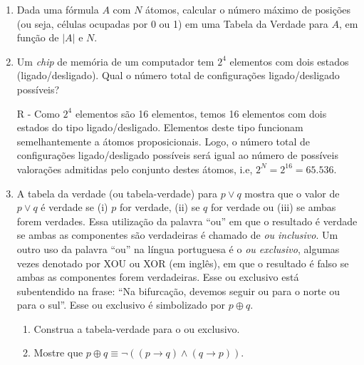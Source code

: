 \documentclass[12pt,a4paper,oneside]{article}
\begin{document}
\begin{enumerate}
	\item Dada uma fórmula $A$ com $N$ átomos, calcular o número máximo de posições (ou seja, células ocupadas por 0 ou 1) em uma Tabela da Verdade para $A$, em função de $|A|$ e $N$.
	
	
	\item Um {\it chip} de memória de um computador tem $2^4$ elementos com dois estados (ligado/desligado). Qual o número total de configurações ligado/desligado possíveis?
	
	{\color{verde} R - Como $2^4$ elementos são 16 elementos, temos 16 elementos com dois estados do tipo ligado/desligado. Elementos deste tipo funcionam semelhantemente a átomos proposicionais. Logo, o número total de configurações ligado/desligado possíveis será igual ao número de possíveis valorações admitidas pelo conjunto destes átomos, i.e, $2^N =2^{16} =  65.536$.	
	}
	
	\item A tabela da verdade (ou tabela-verdade) para $p \vee q$ mostra que o valor de $p \vee q$ é verdade se (i) $p$ for verdade, (ii) se $q$ for verdade ou (iii) se ambas forem verdades. Essa utilização da palavra ``ou'' em que o resultado é verdade se ambas as componentes são verdadeiras é chamado de {\it ou inclusivo}. Um outro uso da palavra ``ou'' na língua portuguesa é o {\it ou exclusivo}, algumas vezes denotado por XOU ou XOR (em inglês), em que o resultado é falso se ambas as componentes forem verdadeiras. Esse ou exclusivo está subentendido na frase: ``Na bifurcação, devemos seguir ou para o norte ou para o sul''. Esse ou exclusivo é simbolizado por $p \oplus q$.
	
		\begin{enumerate}
			\item Construa a tabela-verdade para o ou exclusivo.
			
			\item Mostre que $p \oplus q \equiv \neg ((p \rightarrow q) \wedge (q \rightarrow p))$.
			

\end{enumerate}
\end{enumerate}
\end{document}
